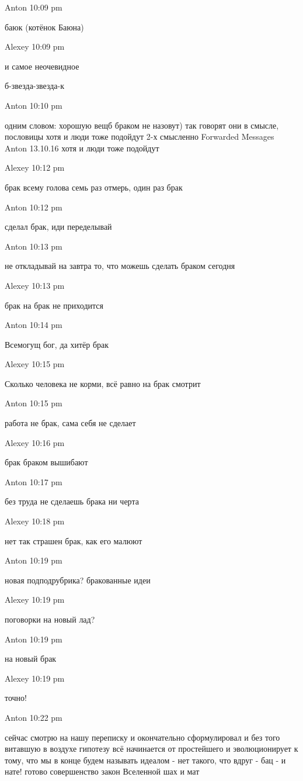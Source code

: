 Anton 10:09 pm

    баюк
    (котёнок Баюна)

Alexey 10:09 pm

    и самое неочевидное

    б-звезда-звезда-к

Anton 10:10 pm

    одним словом: хорошую вещб браком не назовут)
    так говорят они
    в смысле, пословицы
    хотя и люди тоже подойдут
    2-х смысленно
    Forwarded Messages
    Anton 13.10.16
        хотя и люди тоже подойдут

Alexey 10:12 pm

    брак всему голова
    семь раз отмерь, один раз брак

Anton 10:12 pm

    сделал брак, иди переделывай

Anton 10:13 pm

    не откладывай на завтра то, что можешь сделать браком сегодня

Alexey 10:13 pm

    брак на брак не приходится

Anton 10:14 pm

    Всемогущ бог, да хитёр брак

Alexey 10:15 pm

    Сколько человека не корми, всё равно на брак смотрит

Anton 10:15 pm

    работа не брак, сама себя не сделает

Alexey 10:16 pm

    брак браком вышибают

Anton 10:17 pm

    без труда не сделаешь брака ни черта

Alexey 10:18 pm

    нет так страшен брак, как его малюют

Anton 10:19 pm

    новая подподрубрика?
    бракованные идеи

Alexey 10:19 pm

    поговорки на новый лад?

Anton 10:19 pm

    на новый брак

Alexey 10:19 pm

    точно!

Anton 10:22 pm

    сейчас смотрю на нашу переписку и окончательно сформулировал и без того витавшую в воздухе гипотезу
    всё начинается от простейшего и эволюционирует к тому, что мы в конце будем называть идеалом - нет такого, что вдруг - бац - и нате! готово совершенство
    закон Вселенной
    шах и мат


